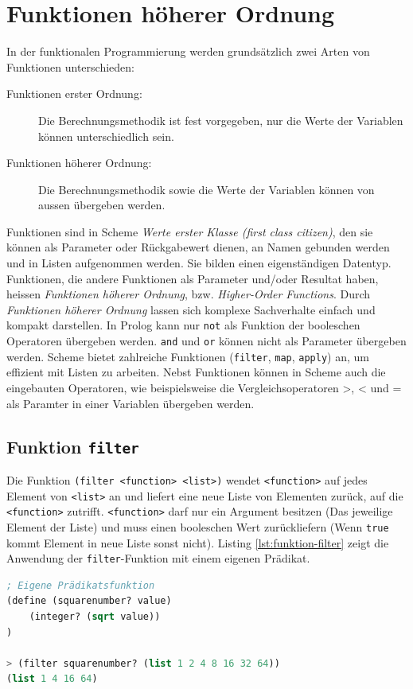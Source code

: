 \section{Funktionen höherer Ordnung}

In der funktionalen Programmierung werden grundsätzlich zwei Arten von Funktionen unterschieden:
\begin{description}
	\item[Funktionen erster Ordnung:] Die Berechnungsmethodik ist fest vorgegeben, nur die Werte der Variablen können unterschiedlich sein.
	\item[Funktionen höherer Ordnung:] Die Berechnungsmethodik sowie die Werte der Variablen können von aussen übergeben werden.
\end{description}
Funktionen sind in Scheme \textit{Werte erster Klasse (first class citizen)}, den sie können als Parameter oder Rückgabewert dienen, an Namen gebunden werden und in Listen aufgenommen werden. Sie bilden einen eigenständigen Datentyp. Funktionen, die andere Funktionen als Parameter und/oder Resultat haben, heissen \textit{Funktionen höherer Ordnung}, bzw. \textit{Higher-Order Functions}. Durch \textit{Funktionen höherer Ordnung} lassen sich komplexe Sachverhalte einfach und kompakt darstellen. In Prolog kann nur \verb|not| als Funktion der booleschen Operatoren übergeben werden. \verb|and| und \verb|or| können nicht als Parameter übergeben werden. Scheme bietet zahlreiche Funktionen (\verb|filter|, \verb|map|, \verb|apply|) an, um effizient mit Listen zu arbeiten. Nebst Funktionen können in Scheme auch die eingebauten Operatoren, wie beispielsweise die Vergleichsoperatoren >, < und = als Paramter in einer Variablen übergeben werden.

\subsection{Funktion \texttt{filter}}

Die Funktion \verb|(filter <function> <list>)| wendet \verb|<function>| auf jedes Element von  \verb|<list>| an und liefert eine neue Liste von Elementen zurück, auf die \verb|<function>| zutrifft. \verb|<function>| darf nur ein Argument besitzen (Das jeweilige Element der Liste) und muss einen booleschen Wert zurückliefern (Wenn \verb|true| kommt Element in neue Liste sonst nicht). Listing \ref{lst:funktion-filter} zeigt die Anwendung der \verb|filter|-Funktion mit einem eigenen Prädikat.

\begin{lstlisting}[language=Lisp, caption=Funktion filter, label=lst:funktion-filter]
; Eigene Prädikatsfunktion
(define (squarenumber? value)
	(integer? (sqrt value))
)

> (filter squarenumber? (list 1 2 4 8 16 32 64))
(list 1 4 16 64)
\end{lstlisting}

